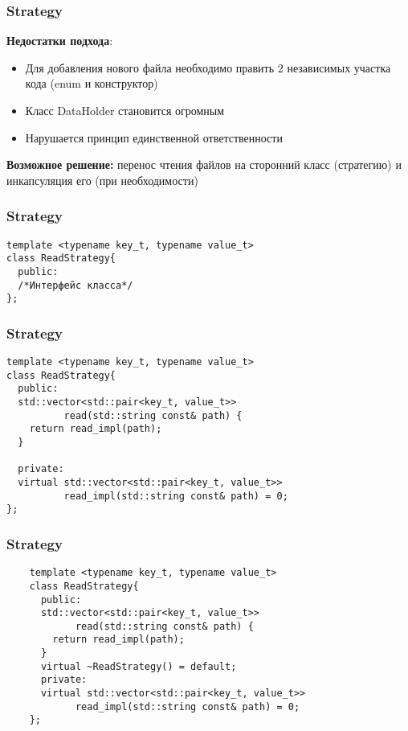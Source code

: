 \begin{frame}
  \frametitle{Strategy}
  \textbf{Недостатки подхода}:
  \begin{itemize}
    \item Для добавления нового файла необходимо править 2 независимых участка кода (enum и конструктор)
    \item Класс DataHolder становится огромным
    \item Нарушается принцип единственной ответственности
  \end{itemize}  

  \vspace{20pt}
  \textbf{Возможное решение:} перенос чтения файлов на сторонний класс (стратегию) и инкапсуляция его (при необходимости)
\end{frame}

\begin{frame}[fragile]
  \frametitle{Strategy}
  \begin{verbatim}
template <typename key_t, typename value_t>
class ReadStrategy{
  public:
  /*Интерфейс класса*/
};
  \end{verbatim}  
\end{frame}

\begin{frame}[fragile]
  \frametitle{Strategy}
  \begin{verbatim}
template <typename key_t, typename value_t>
class ReadStrategy{
  public:
  std::vector<std::pair<key_t, value_t>> 
          read(std::string const& path) {
    return read_impl(path);
  }

  private:
  virtual std::vector<std::pair<key_t, value_t>> 
          read_impl(std::string const& path) = 0;
};
  \end{verbatim}  
\end{frame}

\begin{frame}[fragile]
  \frametitle{Strategy}
  \begin{verbatim}
    template <typename key_t, typename value_t>
    class ReadStrategy{
      public:
      std::vector<std::pair<key_t, value_t>> 
            read(std::string const& path) {
        return read_impl(path);
      }
      virtual ~ReadStrategy() = default;
      private:
      virtual std::vector<std::pair<key_t, value_t>> 
            read_impl(std::string const& path) = 0;
    };
  \end{verbatim}  
\end{frame}

